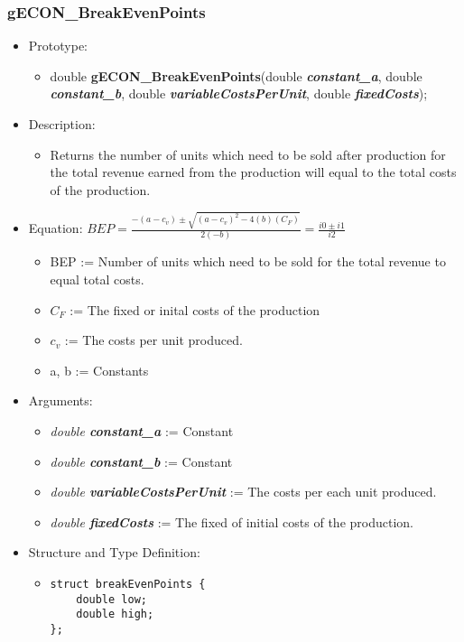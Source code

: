 \documentclass{article}
\begin{document}
{{{{{{%
\cleardoublepage
\subsubsection{gECON\_BreakEvenPoints}

\begin{itemize}
\item Prototype:
	\begin{itemize}
	\item double \textbf{gECON\_BreakEvenPoints}(double \textbf{\textit{constant\_a}}, double \textbf{\textit{constant\_b}}, double \textbf{\textit{variableCostsPerUnit}}, double \textbf{\textit{fixedCosts}});
	\end{itemize}
\item Description:
	\begin{itemize}
	\item Returns the number of units which need to be sold after production for the total revenue earned from the production will equal to the total costs of the production. 
	\end{itemize}
\item Equation:     $BEP = \frac{-(a-c_v)\pm\sqrt{(a-c_v)^2-4(b)(C_F)}}{2(-b)} = \frac{i0\pm i1}{i2}$
	\begin{itemize}[noitemsep]
	\item BEP := Number of units which need to be sold for the total revenue to equal total costs.
	\item $C_F$ := The fixed or inital costs of the production
	\item $c_v$ := The costs per unit produced.
	\item a, b := Constants
	\end{itemize}
\item Arguments:
	\begin{itemize}[noitemsep]
	\item \textit{double \textbf{constant\_a}} := Constant
	\item \textit{double \textbf{constant\_b}} := Constant
	\item \textit{double \textbf{variableCostsPerUnit}} := The costs per each unit produced.
	\item \textit{double \textbf{fixedCosts}} := The fixed of initial costs of the production.
	\end{itemize} 
\item Structure and Type Definition:
	\begin{itemize}https://github.com/sowamy/Galcor
	\item 
\begin{verbatim}
struct breakEvenPoints {
    double low;
    double high;
};


\end{verbatim}
\end{itemize}
\end{itemize}}}}}}}
\end{document}
